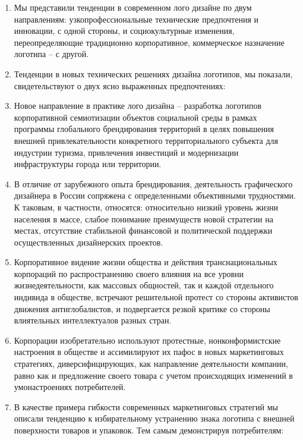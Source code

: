 \begin{enumerate}
\item Мы представили тенденции в современном лого дизайне по двум направлениям: узкопрофессиональные
  технические предпочтения и инновации, с одной стороны, и социокультурные изменения,
  переопределяющие традиционно корпоративное, коммерческое  назначение логотипа -- с другой.
\item Тенденции в новых технических решениях дизайна логотипов, мы показали, свидетельствуют о двух
  ясно выраженных предпочтениях:
\item Новое направление в практике лого дизайна -- разработка логотипов корпоративной семиотизации
  объектов  социальной среды в рамках программы глобального брендирования территорий в целях
  повышения внешней привлекательности конкретного территориального субъекта для индустрии туризма,
  привлечения инвестиций и модернизации инфраструктуры города или территории.
\item В отличие от зарубежного опыта брендирования, деятельность графического дизайнера в России
  сопряжена с  определенными объективными трудностями. К таковым, в частности, относятся:
  относительно низкий уровень жизни населения в массе, слабое понимание преимуществ новой стратегии
  на местах, отсутствие стабильной финансовой и политической поддержки осуществленных дизайнерских
  проектов.
\item Корпоративное видение жизни общества и действия транснациональных корпораций по
  распространению своего влияния на все уровни жизнедеятельности, как массовых общностей, так и
  каждой отдельного индивида в обществе, встречают решительной протест со стороны активистов
  движения антиглобалистов, и подвергается резкой критике со стороны влиятельных интеллектуалов
  разных стран.
\item Корпорации изобретательно используют протестные, нонконформистские настроения в обществе и
  ассимилируют их пафос в новых маркетинговых стратегиях, диверсифицирующих, как направление
  деятельности компании, равно как и предложение своего товара с учетом происходящих изменений в
  умонастроениях потребителей.
\item В качестве примера гибкости современных маркетинговых стратегий мы описали тенденцию к
  избирательному устранению знака логотипа с внешней поверхности товаров и упаковок. Тем самым
  демонстрируя потребителям:
\end{enumerate}
